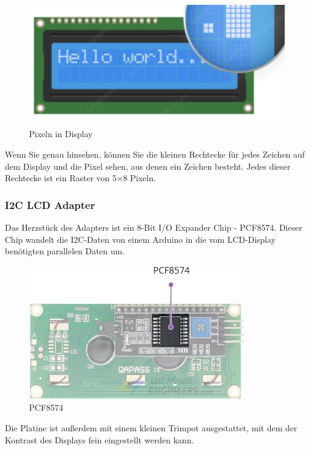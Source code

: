 \documentclass[conference]{IEEEtran}
\begin{document}
\begin{figure}
	\begin{center}
		\includegraphics[scale=0.25]{dspl}
	\end{center}
	\caption{Pixeln in Display}
\end{figure}

Wenn Sie genau hinsehen, können Sie die kleinen Rechtecke für jedes Zeichen auf dem Display und die Pixel sehen, aus denen ein Zeichen besteht. Jedes dieser Rechtecke ist ein Raster von 5×8 Pixeln.

\subsubsection{I2C LCD Adapter}
Das Herzstück des Adapters ist ein 8-Bit I/O Expander Chip - PCF8574. Dieser Chip wandelt die I2C-Daten von einem Arduino in die vom LCD-Display benötigten parallelen Daten um.

\begin{figure}
	\begin{center}
		\includegraphics[scale=0.35]{dspl1}
	\end{center}
	\caption{PCF8574}
\end{figure}

Die Platine ist außerdem mit einem kleinen Trimpot ausgestattet, mit dem der Kontrast des Displays fein eingestellt werden kann.
\end{document}
